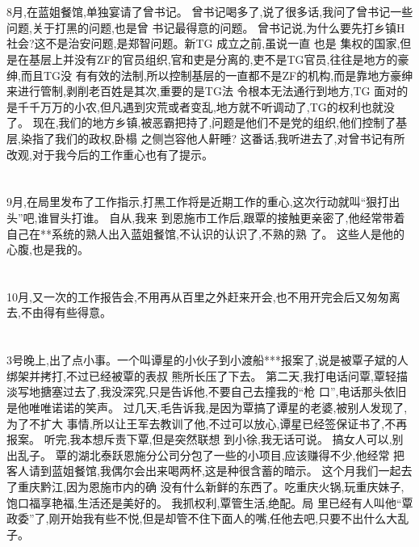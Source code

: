 \documentclass[11pt]{article}
\begin{document}
\section{}
8月,在蓝姐餐馆,单独宴请了曾书记。 曾书记喝多了,说了很多话,我问了曾书记一些问题,关于打黑的问题,也是曾
书记最得意的问题。 曾书记说,为什么要先打乡镇H 社会?这不是治安问题,是郑智问题。新TG 成立之前,虽说一直
也是 集权的国家,但是在基层上并没有ZF的官员组织,官和吏是分离的,吏不是TG官员,往往是地方的豪绅,而且TG没
有有效的法制,所以控制基层的一直都不是ZF的机构,而是靠地方豪绅来进行管制,剥削老百姓是其次,重要的是TG法
令根本无法通行到地方,TG 面对的是千千万万的小农,但凡遇到灾荒或者变乱,地方就不听调动了,TG的权利也就没
了。 现在,我们的地方乡镇,被恶霸把持了,问题是他们不是党的组织,他们控制了基层,染指了我们的政权,卧榻
之侧岂容他人鼾睡? 这番话,我听进去了,对曾书记有所改观,对于我今后的工作重心也有了提示。

\section{}
9月,在局里发布了工作指示,打黑工作将是近期工作的重心,这次行动就叫``狠打出头''吧,谁冒头打谁。 自从,我来
到恩施市工作后,跟覃的接触更亲密了,他经常带着自己在**系统的熟人出入蓝姐餐馆,不认识的认识了,不熟的熟
了。 这些人是他的心腹,也是我的。

\section{}
10月,又一次的工作报告会,不用再从百里之外赶来开会,也不用开完会后又匆匆离去,不由得有些得意。

\section{}
3号晚上,出了点小事。一个叫谭星的小伙子到小渡船***报案了,说是被覃子斌的人绑架并拷打,不过已经被覃的表叔
熊所长压了下去。 第二天,我打电话问覃,覃轻描淡写地搪塞过去了,我没深究,只是告诉他,不要自己去撞我的``枪
口'',电话那头依旧是他唯唯诺诺的笑声。 过几天,毛告诉我,是因为覃搞了谭星的老婆,被别人发现了,为了不扩大
事情,所以让王军去教训了他,不过可以放心,谭星已经签保证书了,不再报案。 听完,我本想斥责下覃,但是突然联想
到小徐,我无话可说。 搞女人可以,别出乱子。 覃的湖北泰跃恩施分公司分包了一些的小项目,应该赚得不少,他经常
把客人请到蓝姐餐馆,我偶尔会出来喝两杯,这是种很含蓄的暗示。 这个月我们一起去了重庆黔江,因为恩施市内的确
没有什么新鲜的东西了。吃重庆火锅,玩重庆妹子,饱口福享艳福,生活还是美好的。 我抓权利,覃管生活,绝配。局
里已经有人叫他``覃政委''了,刚开始我有些不悦,但是却管不住下面人的嘴,任他去吧,只要不出什么大乱子。
\end{document}
